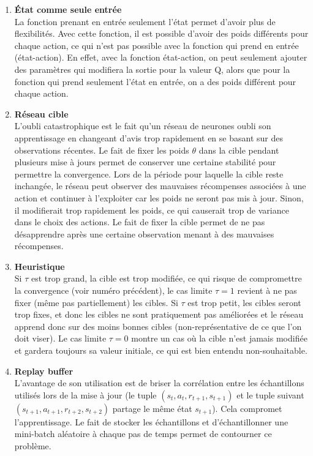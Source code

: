 \documentclass[letterpaper,11pt]{article}
\begin{document}
\begin{enumerate}[label=(\alph*)]

\item \textbf{État comme seule entrée}\\
La fonction prenant en entrée seulement l'état permet d'avoir plus de flexibilités.
Avec cette fonction, il est possible d'avoir des poids différents pour chaque action, ce qui n'est pas possible avec la fonction qui prend en entrée (état-action). En effet, avec la fonction état-action, on peut seulement ajouter des paramètres qui modifiera la sortie pour la valeur Q, alors que pour la fonction qui prend seulement l'état en entrée, on a des poids différent pour chaque action.

\item \textbf{Réseau cible}\\
L'oubli catastrophique est le fait qu'un réseau de neurones oubli son apprentissage en changeant d'avis trop rapidement en se basant sur des observations récentes. Le fait de fixer les poids $\theta$ dans la cible pendant plusieurs mise à jours permet de conserver une certaine stabilité pour permettre la convergence. Lors de la période pour laquelle la cible reste inchangée, le réseau peut observer des mauvaises récompenses associées à une action et continuer à l'exploiter car les poids ne seront pas mis à jour. Sinon, il modifierait trop rapidement les poids, ce qui causerait trop de variance dans le choix des actions. Le fait de fixer la cible permet de ne pas désapprendre après une certaine observation menant à des mauvaises récompenses.  

\item \textbf{Heuristique}\\
Si $\tau$ est trop grand, la cible est trop modifiée, ce qui risque de compromettre la convergence (voir numéro précédent), le cas limite $\tau=1$ revient à ne pas fixer (même pas partiellement) les cibles. Si $\tau$ est trop petit, les cibles seront trop fixes, et donc les cibles ne sont pratiquement pas améliorées et le réseau apprend donc sur des moins bonnes cibles (non-représentative de ce que l'on doit viser). Le cas limite $\tau=0$ montre un cas où la cible n'est jamais modifiée et gardera toujours sa valeur initiale, ce qui est bien entendu non-souhaitable. 

\item \textbf{Replay buffer}\\
L'avantage de son utilisation est de briser la corrélation entre les échantillons utilisés lors de la mise à jour (le tuple $(s_t, a_t, r_{t+1}, s_{t+1})$ et le tuple suivant $(s_{t+1}, a_{t+1}, r_{t+2}, s_{t+2})$ partage le même état $s_{t+1}$). Cela compromet l'apprentissage. Le fait de stocker les échantillons et d'échantillonner une mini-batch aléatoire à chaque pas de temps permet de contourner ce problème. 


\end{enumerate}
\end{document}
